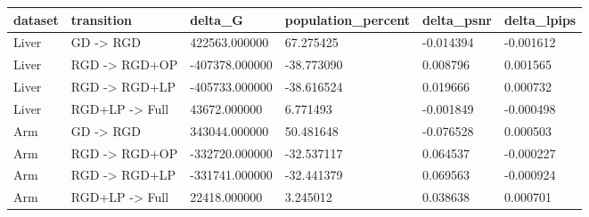 \begin{tabular}{llllll}
dataset & transition & delta\_G & population\_percent & delta\_psnr & delta\_lpips \\
\hline
Liver & GD -> RGD & 422563.000000 & 67.275425 & -0.014394 & -0.001612 \\
Liver & RGD -> RGD+OP & -407378.000000 & -38.773090 & 0.008796 & 0.001565 \\
Liver & RGD -> RGD+LP & -405733.000000 & -38.616524 & 0.019666 & 0.000732 \\
Liver & RGD+LP -> Full & 43672.000000 & 6.771493 & -0.001849 & -0.000498 \\
Arm & GD -> RGD & 343044.000000 & 50.481648 & -0.076528 & 0.000503 \\
Arm & RGD -> RGD+OP & -332720.000000 & -32.537117 & 0.064537 & -0.000227 \\
Arm & RGD -> RGD+LP & -331741.000000 & -32.441379 & 0.069563 & -0.000924 \\
Arm & RGD+LP -> Full & 22418.000000 & 3.245012 & 0.038638 & 0.000701 \\
\end{tabular}
